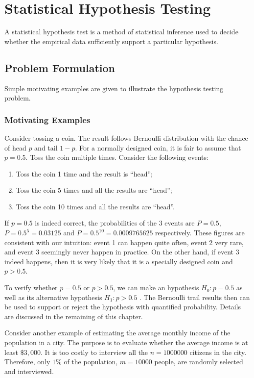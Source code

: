 \chapter{Statistical Hypothesis Testing} \label{ch:ht}

A statistical hypothesis test is a method of statistical inference used to decide whether the empirical data sufficiently support a particular hypothesis.

\section{Problem Formulation}

Simple motivating examples are given to illustrate the hypothesis testing problem.

\subsection{Motivating Examples}

Consider tossing a coin. The result follows Bernoulli distribution with the chance of head $p$ and tail $1-p$. For a normally designed coin, it is fair to assume that $p=0.5$. Toss the coin multiple times. Consider the following events:
\begin{enumerate}
	\item Toss the coin 1 time and the result is ``head'';
	\item Toss the coin 5 times and all the results are ``head'';
	\item Toss the coin 10 times and all the results are ``head''.
\end{enumerate}

If $p=0.5$ is indeed correct, the probabilities of the 3 events are $P=0.5$, $P=0.5^5=0.03125$ and $P=0.5^{10}= 0.0009765625$ respectively. These figures are consistent with our intuition: event 1 can happen quite often, event 2 very rare, and event 3 seemingly never happen in practice. On the other hand, if event 3 indeed happens, then it is very likely that it is a specially designed coin and $p>0.5$.

To verify whether $p=0.5$ or $p>0.5$, we can make an hypothesis $H_0:p=0.5$ as well as its alternative hypothesis $H_1:p>0.5$ . The Bernoulli trail results then can be used to support or reject the hypothesis with quantified probability. Details are discussed in the remaining of this chapter. 

Consider another example of estimating the average monthly income of the population in a city. The purpose is to evaluate whether the average income is at least $\$3,000$. It is too costly to interview all the $n=1000000$ citizens in the city. Therefore, only $1\%$ of the population, $m=10000$ people, are randomly selected and interviewed. 

